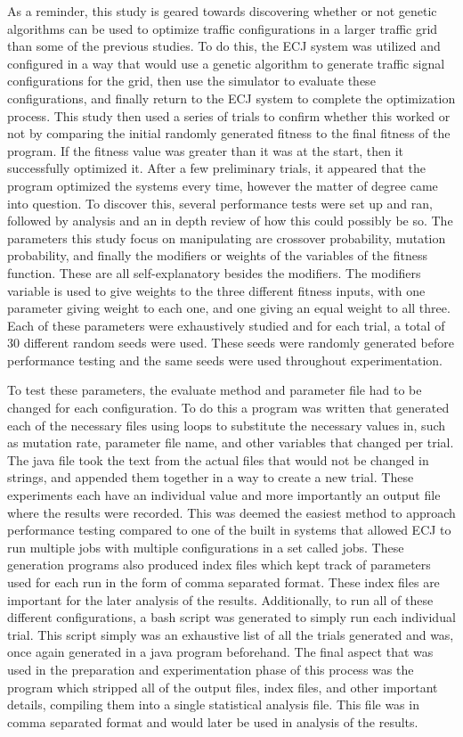 As a reminder, this study is geared towards discovering whether or not genetic algorithms can be used to optimize traffic configurations in a larger traffic grid than some of the previous studies.  To do this, the ECJ system was utilized and configured in a way that would use a genetic algorithm to generate traffic signal configurations for the grid, then use the simulator to evaluate these configurations, and finally return to the ECJ system to complete the optimization process.  This study then used a series of trials to confirm whether this worked or not by comparing the initial randomly generated fitness to the final fitness of the program.  If the fitness value was greater than it was at the start, then it successfully optimized it.  After a few preliminary trials, it appeared that the program optimized the systems every time, however the matter of degree came into question.  To discover this, several performance tests were set up and ran, followed by analysis and an in depth review of how this could possibly be so.  The parameters this study focus on manipulating are  crossover probability, mutation probability, and finally the modifiers or weights of the variables of the fitness function.  These are all self-explanatory besides the modifiers.  The modifiers variable is used to give weights to the three different fitness inputs, with one parameter giving weight to each one, and one giving an equal weight to all three.  Each of these parameters were exhaustively studied and for each trial, a total of 30 different random seeds were used.  These seeds were randomly generated before performance testing and the same seeds were used throughout experimentation.  

To test these parameters, the evaluate method and parameter file had to be changed for each configuration.  To do this a program was written that generated each of the necessary files using loops to substitute the necessary values in, such as mutation rate, parameter file name, and other variables that changed per trial.  The java file took the text from the actual files that would not be changed in strings, and appended them together in a way to create a new trial.  These experiments each have an individual value and more importantly an output file where the results were recorded.  This was deemed the easiest method to approach performance testing compared to one of the built in systems that allowed ECJ to run multiple jobs with multiple configurations in a set called jobs.  These generation programs also produced index files which kept track of parameters used for each run in the form of comma separated format.  These index files are important for the later analysis of the results.  Additionally, to run all of these different configurations, a bash script was generated to simply run each individual trial.  This script simply was an exhaustive list of all the trials generated and was, once again generated in a java program beforehand.  The final aspect that was used in the preparation and experimentation phase of this process was the program which stripped all of the output files, index files, and other important details, compiling them into a single statistical analysis file.  This file was in comma separated format and would later be used in analysis of the results.

